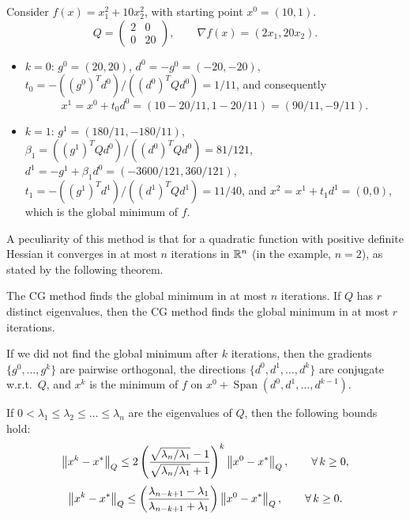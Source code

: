 \begin{example}
    Consider $f(x) = x_1^2 + 10x_2^2$, with starting point $x^0 = (10, 1)$.
    \[
        Q = \begin{pmatrix} 2 & 0\\ 0 & 20 \end{pmatrix}, \qquad \nabla f(x) = (2x_1, 20x_2).
    \]
    \begin{itemize}
        \item $k = 0$: $g^0 = (20, 20)$, $d^0 = -g^0 = (-20, -20)$, $t_0 = -((g^0)^Td^0)/((d^0)^TQd^0) = 1/11$, and consequently
        \[
            x^1 = x^0 + t_0d^0 = (10 - 20/11, 1 - 20/11) = (90/11, -9/11).
        \]
        \item $k = 1$: $g^1 = (180/11, -180/11)$, $\beta_1 = ((g^1)^TQd^0)/((d^0)^TQd^0) = 81/121$, $d^1 = -g^1 + \beta_1d^0 = (-3600/121, 360/121)$, $t_1 = -((g^1)^Td^1)/((d^1)^TQd^1) = 11/40$, and $x^2 = x^1 + t_1d^1 = (0, 0)$, which is the global minimum of $f$.
    \end{itemize}
\end{example}

A peculiarity of this method is that for a quadratic function with positive definite Hessian it converges in at most $n$ iterations in $\mathbb{R}^n$ (in the example, $n = 2$), as stated by the following theorem.

\begin{theorem}[Convergence]
    The CG method finds the global minimum in at most $n$ iterations.
    If $Q$ has $r$ distinct eigenvalues, then the CG method finds the global minimum in at most $r$ iterations.
\end{theorem}

If we did not find the global minimum after $k$ iterations, then the gradients $\{g^0, \dots, g^k\}$ are pairwise orthogonal, the directions $\{d^0, d^1, \dots, d^k\}$ are conjugate w.r.t.\ $Q$, and $x^k$ is the minimum of $f$ on $x^0 + \operatorname{Span}(d^0, d^1, \dots, d^{k-1})$.

\begin{theorem}
    If $0 < \lambda_1 \le \lambda_2 \le \dots \le \lambda_n$ are the eigenvalues of $Q$, then the following bounds hold:
    \[
        \left\lVert x^k - x^* \right\rVert_Q \le 2\left(\frac{\sqrt{\lambda_n/\lambda_1} - 1}{\sqrt{\lambda_n/\lambda_1} + 1}\right)^k \left\lVert x^0 - x^* \right\rVert_Q, \qquad \forall\, k \ge 0,
    \]
    \[
        \left\lVert x^k - x^* \right\rVert_Q \le \left(\frac{\lambda_{n-k+1} - \lambda_1}{\lambda_{n-k+1} + \lambda_1}\right) \left\lVert x^0 - x^* \right\rVert_Q, \qquad \forall\, k \ge 0.
    \]
\end{theorem}

